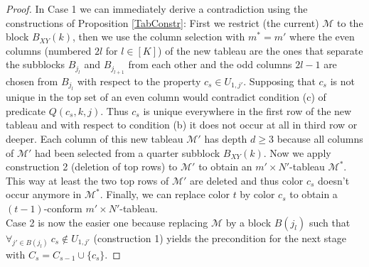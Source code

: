 \documentclass[a4paper,USenglish,numberwithinsect]{lipics}
\theoremstyle{plain}
\begin{document}
\begin{proof}
In Case 1 we can immediately derive a contradiction  using the
constructions of Proposition
\ref{TabConstr}: First we restrict (the current) $\mathcal M$
to the block $B_{XY}(k)$, then we use the column selection with $m^*=m'$
where
the even columns (numbered $2l$ for $l \in [K]$) of the new tableau are
the ones that separate the subblocks
$B_{j_l}$ and $B_{j_{l+1}}$ from each other and the odd columns $2l-1$
are chosen from $B_{j_l}$
with respect to the property $c_s \in U_{1,j'}$. Supposing that  $c_s$
is not unique in the top set of
an even column would contradict condition (c) of
predicate $Q(c_s,k,j)$.
Thus $c_s$ is unique everywhere in the first row of the new tableau and
with respect to condition (b)
it does not occur at all in third row or deeper. Each column of this
new  tableau ${\mathcal M}'$
has depth $d \geq 3$ because all columns of ${\mathcal M}'$ had been
selected from a quarter
subblock $B_{XY}(k)$. Now we apply construction 2 (deletion of top rows)
to ${\mathcal M}'$ to obtain an
$m' \times N'$-tableau ${\mathcal M}^*$.  This way at least the two top
rows of ${\mathcal M}'$
are deleted and thus color $c_s$ doesn't occur anymore in ${\mathcal M}^*$.
Finally, we can  replace color $t$ by  color $c_s$ to obtain a
$(t-1)$-conform
$m' \times N'$-tableau.
\\
Case 2 is now the easier one because replacing $\mathcal M$ by a block
$B(j_l)$ such that
$\forall_{ j' \in B(j_l)} \ c_s \not\in U_{1,j'}$ (construction 1) yields
the precondition for the next
stage with $C_s=C_{s-1} \cup \{c_s\}$.
\end{proof}
\end{document}
